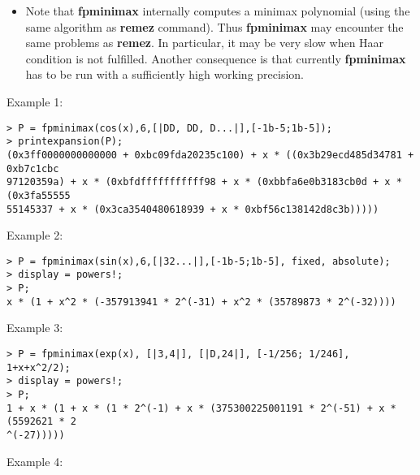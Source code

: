 \begin{itemize}
\item Note that \textbf{fpminimax} internally computes a minimax polynomial (using
   the same algorithm as \textbf{remez} command). Thus \textbf{fpminimax} may encounter
   the same problems as \textbf{remez}. In particular, it may be very slow 
   when Haar condition is not fulfilled. Another consequence is that
   currently \textbf{fpminimax} has to be run with a sufficiently high working precision.
\end{itemize}
\noindent Example 1: 
\begin{center}\begin{minipage}{15cm}\begin{Verbatim}[frame=single]
> P = fpminimax(cos(x),6,[|DD, DD, D...|],[-1b-5;1b-5]);
> printexpansion(P);
(0x3ff0000000000000 + 0xbc09fda20235c100) + x * ((0x3b29ecd485d34781 + 0xb7c1cbc
97120359a) + x * (0xbfdfffffffffff98 + x * (0xbbfa6e0b3183cb0d + x * (0x3fa55555
55145337 + x * (0x3ca3540480618939 + x * 0xbf56c138142d8c3b)))))
\end{Verbatim}
\end{minipage}\end{center}
\noindent Example 2: 
\begin{center}\begin{minipage}{15cm}\begin{Verbatim}[frame=single]
> P = fpminimax(sin(x),6,[|32...|],[-1b-5;1b-5], fixed, absolute);
> display = powers!;
> P;
x * (1 + x^2 * (-357913941 * 2^(-31) + x^2 * (35789873 * 2^(-32))))
\end{Verbatim}
\end{minipage}\end{center}
\noindent Example 3: 
\begin{center}\begin{minipage}{15cm}\begin{Verbatim}[frame=single]
> P = fpminimax(exp(x), [|3,4|], [|D,24|], [-1/256; 1/246], 1+x+x^2/2);
> display = powers!;
> P;
1 + x * (1 + x * (1 * 2^(-1) + x * (375300225001191 * 2^(-51) + x * (5592621 * 2
^(-27)))))
\end{Verbatim}
\end{minipage}\end{center}
\noindent Example 4: 
